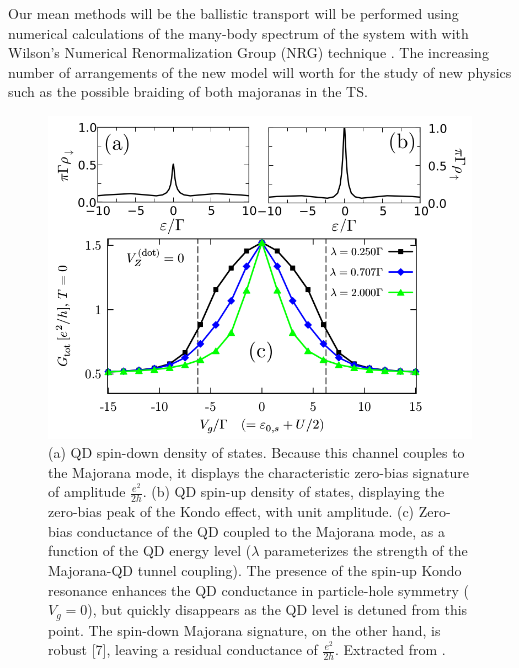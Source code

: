 Our mean methods will be the ballistic transport  will be performed using numerical calculations of the many-body spectrum
of the system with with Wilson\textquoteright s Numerical Renormalization
Group (NRG) technique \citep{wilson_renormalization_1975}. The increasing
number of arrangements of the new model will worth for the study of
new physics such as the possible braiding\citep{kitaev_fault-tolerant_2003}
of both majoranas in the TS. 


\begin{figure}[ht]
\centering
\includegraphics[scale=0.4]{IMAGES/Kondo-Majorana Conductivity.png}
\caption{\label{Fig-Kondo-Majorana conductance}(a) QD spin-down
density of states. Because this channel couples to the Majorana mode,
it displays the characteristic zero-bias signature of amplitude
$\frac{e^{2}}{2h}$. (b) QD spin-up density of states,
displaying the zero-bias peak of the Kondo effect, with
unit amplitude. (c) Zero-bias conductance of the QD coupled
to the Majorana mode, as a function of the QD energy level ($\lambda$
parameterizes the strength of the Majorana-QD tunnel coupling).
The presence of the spin-up Kondo resonance enhances the
QD conductance in particle-hole symmetry ($V_{g}=0$),
but quickly disappears as the QD level is detuned from this point.
The spin-down Majorana signature, on the other hand, is
robust {[}7{]}, leaving a residual conductance of $\frac{e^{2}}{2h}$.
Extracted from \citep{ruiz-tijerina_interaction_2015}.}
\end{figure}




